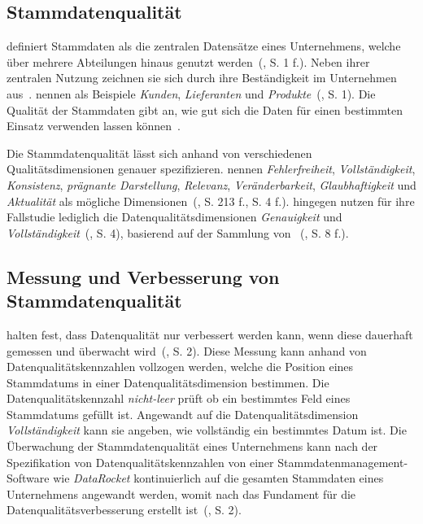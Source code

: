 \documentclass[
  language=german, %
  type=bachelor%
]{isthesis}
\begin{document}
\begin{content}
  \subsection{Stammdatenqualität} \textsc{\citeauthor{otto2012design}} definiert
  Stammdaten als die zentralen Datensätze eines Unternehmens, welche über
  mehrere Abteilungen hinaus genutzt werden~(\citeyear{otto2012design}, S. 1
  f.).  Neben ihrer zentralen Nutzung zeichnen sie sich durch ihre
  Beständigkeit im Unternehmen aus~\cite[][S.  1]{knolmayer2006quality}.
  \textsc{\citeauthor{knolmayer2006quality}} nennen als Beispiele
  \textit{Kunden}, \textit{Lieferanten} und
  \textit{Produkte}~(\citeyear{knolmayer2006quality}, S. 1). Die Qualität der
  Stammdaten gibt an, wie gut sich die Daten für einen bestimmten Einsatz
  verwenden lassen können~\cite[][S.  8]{otto2011stammdatenmanagement}.

  Die Stammdatenqualität lässt sich anhand von verschiedenen
  Qualitätsdimensionen genauer spezifizieren.
  \textsc{\citeauthor{pipino2002data}} nennen \zB{} \textit{Fehlerfreiheit},
  \textit{Vollständigkeit}, \textit{Konsistenz}, \textit{prägnante
  Darstellung}, \textit{Relevanz}, \textit{Veränderbarkeit},
  \textit{Glaubhaftigkeit} und \textit{Aktualität} als mögliche
  Dimensionen~(\citeyear{pipino2002data, legner2007stammdaten}, S. 213 f., S. 4
  f.). \textsc{\citeauthor{baghi2013controlling}} hingegen nutzen für ihre
  Fallstudie lediglich die Datenqualitätsdimensionen \textit{Genauigkeit} und
  \textit{Vollständigkeit}~(\citeyear{baghi2013controlling}, S. 4), basierend
  auf der Sammlung von
  \textsc{\citeauthor{wand1996anchoring}}~(\citeyear{wand1996anchoring}, S. 8
  f.).

	\subsection{Messung und Verbesserung von Stammdatenqualität}
	\textsc{\citeauthor{baghi2013controlling}} halten fest, dass Datenqualität
	nur verbessert werden kann, wenn diese dauerhaft gemessen und überwacht
  wird~(\cite{baghi2013controlling}, S. 2). Diese Messung kann anhand von
	Datenqualitätskennzahlen vollzogen werden, welche die Position eines
	Stammdatums in einer Datenqualitätsdimension bestimmen. Die
	Datenqualitätskennzahl \textit{nicht-leer} prüft \zB{} ob ein bestimmtes Feld
	eines Stammdatums gefüllt ist. Angewandt auf die
	Datenqualitätsdimension \textit{Vollständigkeit} kann sie angeben, wie
	vollständig ein bestimmtes Datum ist. Die Überwachung der Stammdatenqualität
	eines Unternehmens kann nach der Spezifikation von Datenqualitätskennzahlen
	von einer Stammdatenmanagement-Software wie \zB{} \textit{DataRocket}
	kontinuierlich auf die gesamten Stammdaten eines Unternehmens angewandt
	werden, womit nach \textsc{\citeauthor{baghi2013controlling}} das Fundament
  für die Datenqualitätsverbesserung erstellt ist~(\citeyear{baghi2013controlling}, S. 2).


\end{content}
\end{document}
